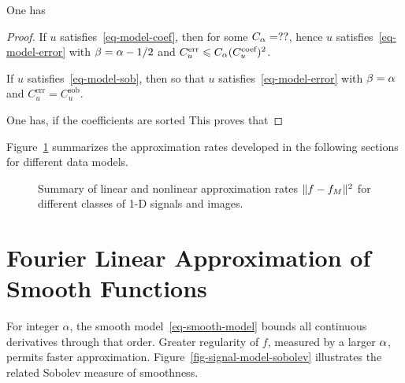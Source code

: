 \begin{prop}\label{prop-relation-compressibility}
	One has
\end{prop}

\begin{proof}
	If $u$ satisfies~\eqref{eq-model-coef}, then 
	for some $C_\alpha=??$, hence $u$ satisfies~\eqref{eq-model-error} with $\beta=\alpha-1/2$ and $C_u^{\text{err}} \leqslant C_\alpha (C_u^{\text{coef}})^2$.
	
	If $u$ satisfies~\eqref{eq-model-sob}, then
	so that $u$ satisfies~\eqref{eq-model-error} with $\beta=\alpha$ and $C_u^{\text{err}}=C_u^{\text{sob}}$.
	
	One has, if the coefficients are sorted
	This proves that

\end{proof}
\fi



Figure~\ref{fig-approx-comparaison} summarizes the approximation rates developed in the following sections for different data models.

\begin{figure}[tbp]
\centering
{}
\caption{Summary of linear and nonlinear approximation rates
	$\lVert f-f_M\rVert^2$ for different classes of 1-D signals and images.}
\label{fig-approx-comparaison}
\end{figure}


\section{Fourier Linear Approximation of Smooth Functions}

For integer $\alpha$, the smooth model~\eqref{eq-smooth-model} bounds all continuous derivatives through that order. Greater regularity of $f$, measured by a larger $\alpha$, permits faster approximation. Figure~\ref{fig-signal-model-sobolev} illustrates the related Sobolev measure of smoothness.

